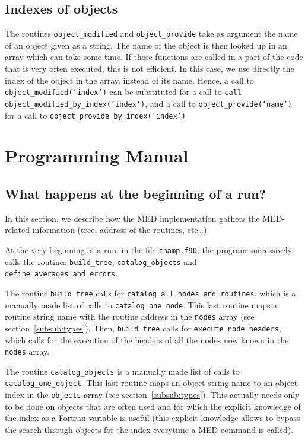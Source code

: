 \documentclass[letter,11pt]{article}
\begin{document}
\subsection{Indexes of objects}
The routines {\tt object_modified} and {\tt object_provide} take as argument the name of an object given as a string. The name of the object is then looked up in an array which can take some time. If these functions are called in a part of the code that is very often executed, this is not efficient. In this case, we use directly the index of the object in the array, instead of its name.
Hence, a call to {\tt object_modified(`index')} can be substituted for a call to {\tt call object_modified_by_index(`index')}, and a call to {\tt object_provide(`name')} for a call to {\tt object_provide_by_index(`index')}


\section{Programming Manual}

\subsection{What happens at the beginning of a run?}
\label{sub:begin}

In this section, we describe how the MED implementation gathers the MED-related information (tree, address of the routines, etc\dots)

At the very beginning of a run, in the file {\tt champ.f90}, the program successively calls the routines {\tt build_tree}, {\tt catalog_objects} and {\tt define_averages_and_errors}.

The routine {\tt build_tree} calls for {\tt catalog_all_nodes_and_routines}, which is a manually made list of calls to {\tt catalog_one_node}. This last routine maps a routine string name with the routine address in the {\tt nodes} array (see section~\ref{subsub:types}). Then, {\tt build_tree} calls for {\tt execute_node_headers}, which calls for the execution of the headers of all the nodes now known in the {\tt nodes} array.

The routine {\tt catalog_objects} is a manually made list of calls to {\tt catalog_one_object}. This last routine maps an object string name to an object index in the {\tt objects} array (see section~\ref{subsub:types}). This actually needs only to be done on objects that are often used and for which the explicit knowledge of the index as a Fortran variable is useful (this explicit knowledge allows to bypass the search through objects for the index everytime a MED command is called).
\end{document}
